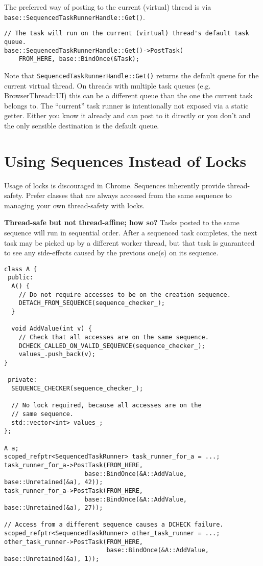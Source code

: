 \documentclass[a4paper,12pt,notitlepage,twoside,openright]{article}
\begin{document}
The preferred way of posting to the current (virtual) thread is via
\texttt{base::SequencedTaskRunnerHandle::Get()}.

\begin{verbatim}
// The task will run on the current (virtual) thread's default task queue.
base::SequencedTaskRunnerHandle::Get()->PostTask(
    FROM_HERE, base::BindOnce(&Task);
\end{verbatim}

Note that \texttt{SequencedTaskRunnerHandle::Get()} returns the default queue for
the current virtual thread. On threads with multiple task queues (e.g.
BrowserThread::UI) this can be a different queue than the one the
current task belongs to. The ``current'' task runner is intentionally
not exposed via a static getter. Either you know it already and can post
to it directly or you don't and the only sensible destination is the
default queue.

\hypertarget{using-sequences-instead-of-locks}{%
\section{Using Sequences Instead of
Locks}\label{using-sequences-instead-of-locks}}

Usage of locks is discouraged in Chrome. Sequences inherently provide
thread-safety. Prefer classes that are always accessed from the same
sequence to managing your own thread-safety with locks.

\textbf{Thread-safe but not thread-affine; how so?} Tasks posted to the
same sequence will run in sequential order. After a sequenced task
completes, the next task may be picked up by a different worker thread,
but that task is guaranteed to see any side-effects caused by the
previous one(s) on its sequence.

\begin{verbatim}
class A {
 public:
  A() {
    // Do not require accesses to be on the creation sequence.
    DETACH_FROM_SEQUENCE(sequence_checker_);
  }

  void AddValue(int v) {
    // Check that all accesses are on the same sequence.
    DCHECK_CALLED_ON_VALID_SEQUENCE(sequence_checker_);
    values_.push_back(v);
}

 private:
  SEQUENCE_CHECKER(sequence_checker_);

  // No lock required, because all accesses are on the
  // same sequence.
  std::vector<int> values_;
};

A a;
scoped_refptr<SequencedTaskRunner> task_runner_for_a = ...;
task_runner_for_a->PostTask(FROM_HERE,
                      base::BindOnce(&A::AddValue, base::Unretained(&a), 42));
task_runner_for_a->PostTask(FROM_HERE,
                      base::BindOnce(&A::AddValue, base::Unretained(&a), 27));

// Access from a different sequence causes a DCHECK failure.
scoped_refptr<SequencedTaskRunner> other_task_runner = ...;
other_task_runner->PostTask(FROM_HERE,
                            base::BindOnce(&A::AddValue, base::Unretained(&a), 1));
\end{verbatim}
\end{document}
